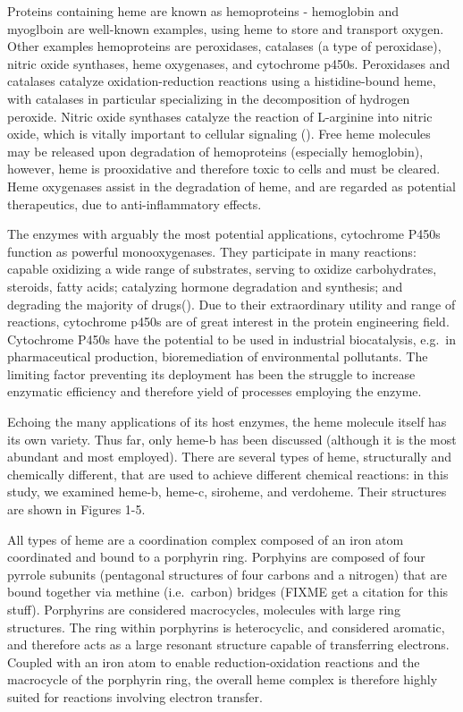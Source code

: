 \documentclass[a4paper, nobind]{templates/ociamthesis}
\begin{document}
Proteins containing heme are known as hemoproteins - hemoglobin and myoglboin are well-known examples, using heme to store and transport oxygen. Other examples hemoproteins are peroxidases, catalases (a type of peroxidase), nitric oxide synthases, heme oxygenases, and cytochrome p450s. Peroxidases and catalases catalyze oxidation-reduction reactions using a histidine-bound heme, with catalases in particular specializing in the decomposition of hydrogen peroxide. Nitric oxide synthases catalyze the reaction of L-arginine into nitric oxide, which is vitally important to cellular signaling (\textcite{Poulos2014}). Free heme molecules may be released upon degradation of hemoproteins (especially hemoglobin), however, heme is prooxidative and therefore toxic to cells and must be cleared. Heme oxygenases assist in the degradation of heme, and are regarded as potential therapeutics, due to anti-inflammatory effects\autocite{Araujo2012}.

The enzymes with arguably the most potential applications, cytochrome P450s function as powerful monooxygenases. They participate in many reactions: capable oxidizing a wide range of substrates, serving to oxidize carbohydrates, steroids, fatty acids; catalyzing hormone degradation and synthesis; and degrading the majority of drugs(\textcite{Poulos2014}). Due to their extraordinary utility and range of reactions, cytochrome p450s are of great interest in the protein engineering field. Cytochrome P450s have the potential to be used in industrial biocatalysis, e.g.~in pharmaceutical production, bioremediation of environmental pollutants\autocite{Du2017,Lalonde2016}. The limiting factor preventing its deployment has been the struggle to increase enzymatic efficiency and therefore yield of processes employing the enzyme\autocite{Girvan2016,Li2020}.

Echoing the many applications of its host enzymes, the heme molecule itself has its own variety. Thus far, only heme-b has been discussed (although it is the most abundant and most employed). There are several types of heme, structurally and chemically different, that are used to achieve different chemical reactions: in this study, we examined heme-b, heme-c, siroheme, and verdoheme. Their structures are shown in Figures 1-5.

All types of heme are a coordination complex composed of an iron atom coordinated and bound to a porphyrin ring. Porphyins are composed of four pyrrole subunits (pentagonal structures of four carbons and a nitrogen) that are bound together via methine (i.e.~carbon) bridges (FIXME get a citation for this stuff). Porphyrins are considered macrocycles, molecules with large ring structures. The ring within porphyrins is heterocyclic, and considered aromatic, and therefore acts as a large resonant structure capable of transferring electrons. Coupled with an iron atom to enable reduction-oxidation reactions and the macrocycle of the porphyrin ring, the overall heme complex is therefore highly suited for reactions involving electron transfer.
\end{document}

